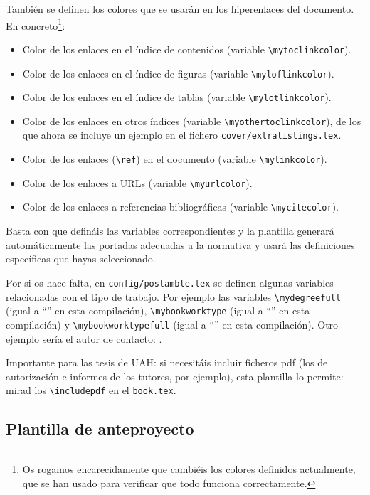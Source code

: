 También se definen los colores que se usarán en los hiperenlaces del
documento. En concreto\footnote{Os rogamos encarecidamente que cambiéis
  los colores definidos actualmente, que se han usado para verificar que
  todo funciona correctamente.}:

\begin{itemize}
\item Color de los enlaces en el índice de contenidos (variable
  \texttt{\textbackslash{}mytoclinkcolor}).
\item Color de los enlaces en el índice de figuras (variable
  \texttt{\textbackslash{}myloflinkcolor}).
\item Color de los enlaces en el índice de tablas (variable
  \texttt{\textbackslash{}mylotlinkcolor}).
\item Color de los enlaces en otros índices (variable
  \texttt{\textbackslash{}myothertoclinkcolor}), de los que ahora se
  incluye un ejemplo en el fichero \texttt{cover/extralistings.tex}.
\item Color de los enlaces (\texttt{\textbackslash{}ref}) en el
  documento (variable \texttt{\textbackslash{}mylinkcolor}).
\item Color de los enlaces a URLs (variable
  \texttt{\textbackslash{}myurlcolor}).
\item Color de los enlaces a referencias bibliográficas (variable
  \texttt{\textbackslash{}mycitecolor}).
\end{itemize}

Basta con que defináis las variables correspondientes y la plantilla
generará automáticamente las portadas adecuadas a la normativa y usará
las definiciones específicas que hayas seleccionado.

Por si os hace falta, en \texttt{config/postamble.tex} se definen
algunas variables relacionadas con el tipo de trabajo. Por ejemplo las
variables \texttt{\textbackslash{}mydegreefull} (igual a
``\mydegreefull'' en esta compilación),
\texttt{\textbackslash{}mybookworktype} (igual a ``\mybookworktype'' en
esta compilación) y \texttt{\textbackslash{}mybookworktypefull} (igual a
``\mybookworktypefull'' en esta compilación). Otro ejemplo sería el
autor de contacto: \contactauthor.

Importante para las tesis de UAH: si necesitáis incluir ficheros pdf
(los de autorización e informes de los tutores, por ejemplo), esta
plantilla lo permite: mirad los \texttt{\textbackslash{}includepdf} en
el \texttt{book.tex}.

\subsection{Plantilla de anteproyecto}
\label{sec:plantilla-de-anteproyecto}


